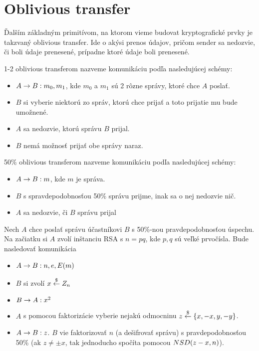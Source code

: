 \section{Oblivious transfer}

Ďalším základným primitívom, na ktorom vieme budovat kryptografické
prvky je takzvaný oblivious transfer. Ide o akýsi prenos údajov,
pričom sender sa nedozvie, či boli údaje prenesené, prípadne ktoré
údaje boli prenesené.

\begin{definicia}[1-2 OT]
    1-2 oblivious transferom nazveme komunikáciu podľa nasledujúcej
    schémy:
    \begin{itemize}
        \item $A \rightarrow B: m_0, m_1$, kde $m_0$ a $m_1$ sú 2 rôzne
        správy, ktoré chce $A$ poslať.
        \item $B$ si vyberie niektorú zo správ, ktorú chce prijať a
        toto prijatie mu bude umožnené.
        \item $A$ sa nedozvie, ktorú správu $B$ prijal.
        \item $B$ nemá možnosť prijať obe správy naraz.        
    \end{itemize}
\end{definicia}

\begin{definicia}[50\% OT]
    50\% oblivious transferom nazveme komunikáciu podľa nasledujúcej
    schémy:
    \begin{itemize}
        \item $A \rightarrow B: m$, kde $m$ je správa.
        \item $B$ s spravdepodobnosťou 50\% správu prijme, inak sa o
        nej nedozvie nič.
        \item $A$ sa nedozvie, či $B$ správu prijal
    \end{itemize}
\end{definicia}

\begin{priklad}[Realizácia 50\% OT]
    Nech $A$ chce poslať správu účastníkovi $B$ s 50\%-nou
    pravdepodobnosťou úspechu. Na začiatku si $A$ zvolí inštanciu RSA
    s $n=pq$, kde $p,q$ sú veľké prvočísla. Bude nasledovať
    komunikácia
 \begin{itemize}
    \compactlist
    \item $A \rightarrow B: n,e,E(m)$ 
    \item $B$ si zvolí $x \overset{\$}{\leftarrow} Z_n$
    \item $B \rightarrow A: x^2$
    \item $A$ s pomocou faktorizácie vyberie nejakú odmocninu
        $z \overset{\$}{\leftarrow} \{x,-x,y,-y\}$.
    \item $A \rightarrow B: z$.
    $B$ vie faktorizovať $n$ (a dešifrovať správu) s
    pravdepodobnosťou 50\% (ak $z \not = \pm x$, tak jednoducho
    spočíta pomocou $NSD(z-x, n)$).
 \end{itemize} 
\end{priklad}

